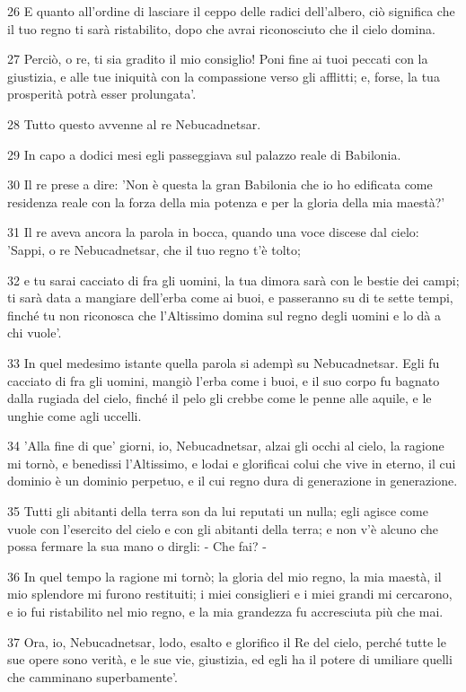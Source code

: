 \par 26 E quanto all'ordine di lasciare il ceppo delle radici dell'albero, ciò significa che il tuo regno ti sarà ristabilito, dopo che avrai riconosciuto che il cielo domina.
\par 27 Perciò, o re, ti sia gradito il mio consiglio! Poni fine ai tuoi peccati con la giustizia, e alle tue iniquità con la compassione verso gli afflitti; e, forse, la tua prosperità potrà esser prolungata'.
\par 28 Tutto questo avvenne al re Nebucadnetsar.
\par 29 In capo a dodici mesi egli passeggiava sul palazzo reale di Babilonia.
\par 30 Il re prese a dire: 'Non è questa la gran Babilonia che io ho edificata come residenza reale con la forza della mia potenza e per la gloria della mia maestà?'
\par 31 Il re aveva ancora la parola in bocca, quando una voce discese dal cielo: 'Sappi, o re Nebucadnetsar, che il tuo regno t'è tolto;
\par 32 e tu sarai cacciato di fra gli uomini, la tua dimora sarà con le bestie dei campi; ti sarà data a mangiare dell'erba come ai buoi, e passeranno su di te sette tempi, finché tu non riconosca che l'Altissimo domina sul regno degli uomini e lo dà a chi vuole'.
\par 33 In quel medesimo istante quella parola si adempì su Nebucadnetsar. Egli fu cacciato di fra gli uomini, mangiò l'erba come i buoi, e il suo corpo fu bagnato dalla rugiada del cielo, finché il pelo gli crebbe come le penne alle aquile, e le unghie come agli uccelli.
\par 34 'Alla fine di que' giorni, io, Nebucadnetsar, alzai gli occhi al cielo, la ragione mi tornò, e benedissi l'Altissimo, e lodai e glorificai colui che vive in eterno, il cui dominio è un dominio perpetuo, e il cui regno dura di generazione in generazione.
\par 35 Tutti gli abitanti della terra son da lui reputati un nulla; egli agisce come vuole con l'esercito del cielo e con gli abitanti della terra; e non v'è alcuno che possa fermare la sua mano o dirgli: - Che fai? -
\par 36 In quel tempo la ragione mi tornò; la gloria del mio regno, la mia maestà, il mio splendore mi furono restituiti; i miei consiglieri e i miei grandi mi cercarono, e io fui ristabilito nel mio regno, e la mia grandezza fu accresciuta più che mai.
\par 37 Ora, io, Nebucadnetsar, lodo, esalto e glorifico il Re del cielo, perché tutte le sue opere sono verità, e le sue vie, giustizia, ed egli ha il potere di umiliare quelli che camminano superbamente'.


